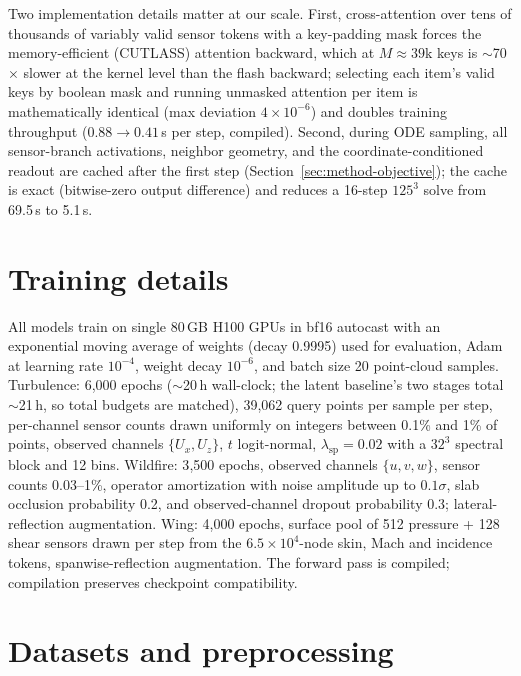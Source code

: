 \documentclass{article} %
\begin{document}
Two implementation details matter at our scale. First, cross-attention over tens of thousands of variably valid sensor tokens with a key-padding mask forces the memory-efficient (CUTLASS) attention backward, which at $M{\approx}39$k keys is $\sim$70$\times$ slower at the kernel level than the flash backward; selecting each item's valid keys by boolean mask and running unmasked attention per item is mathematically identical (max deviation $4\times10^{-6}$) and doubles training throughput ($0.88\to0.41$\,s per step, compiled). Second, during ODE sampling, all sensor-branch activations, neighbor geometry, and the coordinate-conditioned readout are cached after the first step (Section~\ref{sec:method-objective}); the cache is exact (bitwise-zero output difference) and reduces a 16-step $125^3$ solve from 69.5\,s to 5.1\,s.

\section{Training details}
\label{app:training}

All models train on single 80\,GB H100 GPUs in bf16 autocast with an exponential moving average of weights (decay 0.9995) used for evaluation, Adam at learning rate $10^{-4}$, weight decay $10^{-6}$, and batch size 20 point-cloud samples. Turbulence: 6{,}000 epochs ($\sim$20\,h wall-clock; the latent baseline's two stages total $\sim$21\,h, so total budgets are matched), 39{,}062 query points per sample per step, per-channel sensor counts drawn uniformly on integers between 0.1\% and 1\% of points, observed channels $\{U_x,U_z\}$, $t$ logit-normal, $\lambda_{\mathrm{sp}}{=}0.02$ with a $32^3$ spectral block and 12 bins. Wildfire: 3{,}500 epochs, observed channels $\{u,v,w\}$, sensor counts 0.03--1\%, operator amortization with noise amplitude up to $0.1\sigma$, slab occlusion probability 0.2, and observed-channel dropout probability 0.3; lateral-reflection augmentation. Wing: 4{,}000 epochs, surface pool of 512 pressure + 128 shear sensors drawn per step from the $6.5\times10^4$-node skin, Mach and incidence tokens, spanwise-reflection augmentation. The forward pass is compiled; compilation preserves checkpoint compatibility.

\section{Datasets and preprocessing}
\label{app:datasets}
\end{document}
